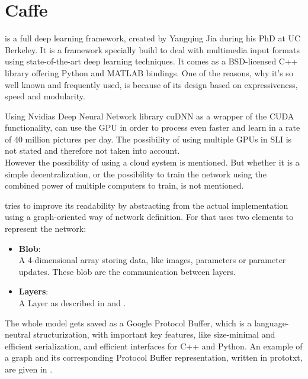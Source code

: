 \section{Caffe} \label{sec: Caffe}


\caffe is a full deep learning framework, created by Yangqing Jia during his PhD at UC Berkeley. It is a framework specially build to deal with multimedia input formats using state-of-the-art deep learning techniques. It comes as a BSD-licensed C++ library offering Python and MATLAB bindings. One of the reasons, why it's so well known and frequently used, is because of its design based on expressiveness, speed and modularity.

Using Nvidias Deep Neural Network library cuDNN as a wrapper of the CUDA functionality, \caffe can use the GPU in order to process even faster and learn in a rate of 40 million pictures per day. The possibility of using multiple GPUs in SLI is not stated and therefore not taken into account. \cite{CaffeAndcuDNN}\\
However the possibility of using a cloud system is mentioned. But whether it is a simple decentralization, or the possibility to train the network using the combined power of multiple computers to train, is not mentioned. \cite{jia2014caffe}

\caffe tries to improve its readability by abstracting from the actual implementation using a graph-oriented way of network definition. For that \caffe uses two elements to represent the network:
\begin{itemize}
	\item \textbf{Blob}:\\
		A 4-dimensional array storing data, like images, parameters or parameter updates. These blob are the communication between layers.
	\item \textbf{Layers}:\\
		A Layer as described in  and .
\end{itemize}
The whole model gets saved as a Google Protocol Buffer, which is a language-neutral structurization, with important key features, like size-minimal and efficient serialization, and efficient interfaces for C++ and Python. \cite{jia2014caffe} \cite{varda2008protocol}
An example of a graph and its corresponding Protocol Buffer representation, written in prototxt, are given in .



